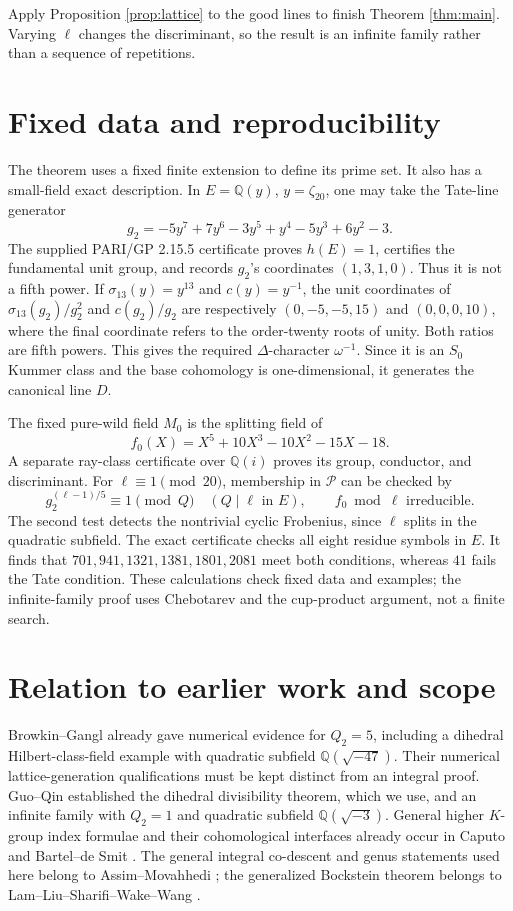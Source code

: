 \documentclass[11pt]{article}
\theoremstyle{remark}\newtheorem{remark}[theorem]{Remark}
\newcommand{\Q}{\mathbb Q}\newcommand{\Z}{\mathbb Z}
\begin{document}
Apply Proposition \ref{prop:lattice} to the good lines to finish
Theorem \ref{thm:main}. Varying \(\ell\) changes the discriminant, so the
result is an infinite family rather than a sequence of repetitions.

\section{Fixed data and reproducibility}
The theorem uses a fixed finite extension to define its prime set.
It also has a small-field exact description. In \(E=\Q(y)\), \(y=\zeta_{20}\),
one may take the Tate-line generator
\[
 g_2=-5y^7+7y^6-3y^5+y^4-5y^3+6y^2-3.
\]
The supplied PARI/GP 2.15.5 certificate proves \(h(E)=1\), certifies the
fundamental unit group, and records \(g_2\)'s coordinates \((1,3,1,0)\).
Thus it is not a fifth power. If \(\sigma_{13}(y)=y^{13}\) and
\(c(y)=y^{-1}\), the unit coordinates of
\(\sigma_{13}(g_2)/g_2^2\) and \(c(g_2)/g_2\) are respectively
\((0,-5,-5,15)\) and \((0,0,0,10)\), where the final coordinate refers to
the order-twenty roots of unity. Both ratios are fifth powers. This gives the
required \(\Delta\)-character \(\omega^{-1}\). Since it is an \(S_0\) Kummer
class and the base cohomology is one-dimensional, it generates the canonical
line \(D\).

The fixed pure-wild field \(M_0\) is the splitting field of
\[
 f_0(X)=X^5+10X^3-10X^2-15X-18.
\]
A separate ray-class certificate over \(\Q(i)\) proves its group,
conductor, and discriminant. For \(\ell\equiv1\pmod{20}\), membership in
\(\mathcal P\) can be checked by
\[
 g_2^{(\ell-1)/5}\equiv1\pmod Q\quad(Q\mid\ell\text{ in }E),
 \qquad f_0\bmod\ell\text{ irreducible}.
\]
The second test detects the nontrivial cyclic Frobenius, since \(\ell\) splits
in the quadratic subfield. The exact certificate checks all eight residue
symbols in \(E\). It finds that \(701,941,1321,1381,1801,2081\) meet both
conditions, whereas \(41\) fails the Tate condition. These calculations check
fixed data and examples; the infinite-family proof uses Chebotarev and the
cup-product argument, not a finite search.

\section{Relation to earlier work and scope}
Browkin--Gangl \cite[Section 12.4]{BG} already gave numerical evidence for
\(Q_2=5\), including a dihedral Hilbert-class-field example with quadratic
subfield \(\Q(\sqrt{-47})\). Their numerical lattice-generation qualifications
must be kept distinct from an integral proof. Guo--Qin \cite{GQ} established
the dihedral divisibility theorem, which we use, and an infinite family with
\(Q_2=1\) and quadratic subfield \(\Q(\sqrt{-3})\).
General higher \(K\)-group index formulae and their cohomological interfaces
already occur in Caputo \cite{Caputo12,Caputo26} and Bartel--de Smit
\cite{BS}. The general integral
co-descent and genus statements used here belong to Assim--Movahhedi
\cite{AM12,AM19}; the generalized Bockstein theorem belongs to
Lam--Liu--Sharifi--Wake--Wang \cite{LLSWW}.
\end{document}
